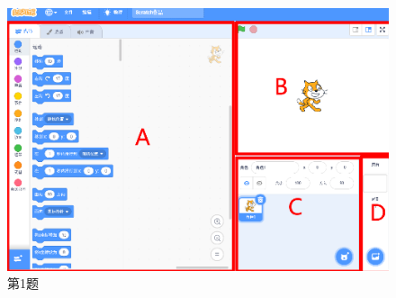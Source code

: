 \documentclass[10pt, a4paper]{article}
\begin{document}
\begin{enumerate}
        \begin{figure}[htbp]
            \centering
            \begin{minipage}[t]{.24\textwidth}
                \centering
                \includegraphics[width=1\textwidth]{1.png}
                \caption*{第1题}
            \end{minipage}
            \begin{minipage}[t]{.1\textwidth}
                \centering

\end{minipage}
\end{figure}
\end{enumerate}
\end{document}
